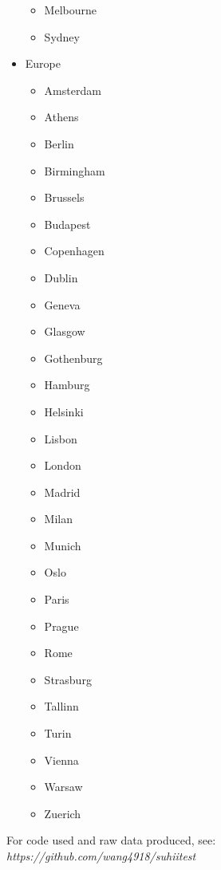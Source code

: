 \documentclass{article}
\begin{document}
\begin{itemize}
\begin{itemize}
        \item Melbourne
        \item Sydney
    \end{itemize}
    \item Europe
    \begin{itemize}
        \item Amsterdam
        \item Athens
        \item Berlin
        \item Birmingham
        \item Brussels
        \item Budapest
        \item Copenhagen
        \item Dublin
        \item Geneva
        \item Glasgow
        \item Gothenburg
        \item Hamburg
        \item Helsinki
        \item Lisbon
        \item London
        \item Madrid
        \item Milan
        \item Munich
        \item Oslo
        \item Paris
        \item Prague
        \item Rome
        \item Strasburg
        \item Tallinn
        \item Turin
        \item Vienna
        \item Warsaw
        \item Zuerich
    \end{itemize}
\end{itemize}

For code used and raw data produced, see:
\textit{https://github.com/wang4918/suhiitest}

\medskip

\printbibliography
\end{document}
